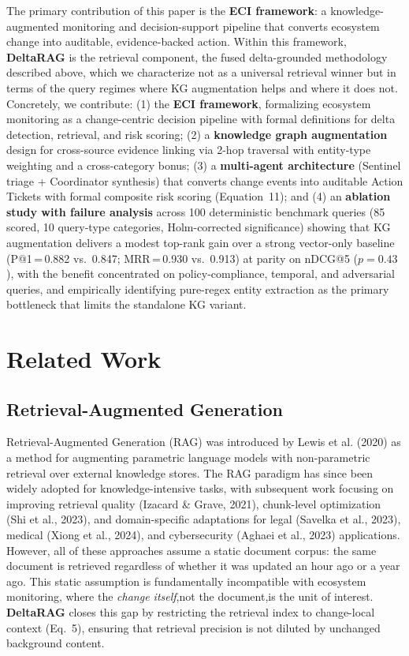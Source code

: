 \documentclass[
]{article}
\begin{document}
The primary contribution of this paper is the \textbf{ECI framework}: a
knowledge-augmented monitoring and decision-support pipeline that
converts ecosystem change into auditable, evidence-backed action. Within
this framework, \textbf{DeltaRAG} is the retrieval component, the fused
delta-grounded methodology described above, which we characterize not as
a universal retrieval winner but in terms of the query regimes where
KG augmentation helps and where it does not. Concretely, we contribute:
(1) the \textbf{ECI framework}, formalizing
ecosystem monitoring as a change-centric decision pipeline with formal
definitions for delta detection, retrieval, and risk scoring; (2) a \textbf{knowledge graph augmentation} design
for cross-source evidence linking via 2-hop traversal with entity-type
weighting and a cross-category bonus; (3) a
\textbf{multi-agent architecture} (Sentinel triage + Coordinator
synthesis) that converts change events into auditable Action Tickets
with formal composite risk scoring (Equation~11); and (4) an
\textbf{ablation study with failure analysis} across 100 deterministic
benchmark queries (85 scored, 10 query-type categories, Holm-corrected
significance) showing that KG augmentation delivers a modest top-rank
gain over a strong vector-only baseline (P@1\,=\,0.882 vs.\ 0.847;
MRR\,=\,0.930 vs.\ 0.913) at parity on nDCG@5 ($p = 0.43$), with the
benefit concentrated on policy-compliance, temporal, and adversarial
queries, and empirically identifying pure-regex entity extraction as the
primary bottleneck that limits the standalone KG variant.

\section{Related Work}\label{related-work}

\subsection{Retrieval-Augmented
Generation}\label{retrieval-augmented-generation}

Retrieval-Augmented Generation (RAG) was introduced by Lewis et al.
(2020) as a method for augmenting parametric language models with
non-parametric retrieval over external knowledge stores. The RAG
paradigm has since been widely adopted for knowledge-intensive tasks,
with subsequent work focusing on improving retrieval quality (Izacard \&
Grave, 2021), chunk-level optimization (Shi et al., 2023), and
domain-specific adaptations for legal (Savelka et al., 2023), medical
(Xiong et al., 2024), and cybersecurity (Aghaei et al., 2023)
applications. However, all of these approaches assume a static document
corpus: the same document is retrieved regardless of whether it was
updated an hour ago or a year ago. This static assumption is
fundamentally incompatible with ecosystem monitoring, where the
\emph{change itself},not the document,is the unit of interest.
\textbf{DeltaRAG} closes this gap by restricting the retrieval index to
change-local context (Eq.~5), ensuring that retrieval precision is not
diluted by unchanged background content.
\end{document}
